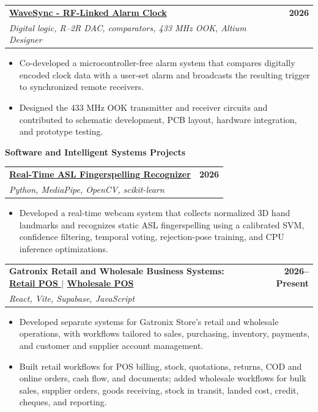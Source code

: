 \documentclass[a4paper,10pt]{article}
\makeatletter
\newcommand{\projectEntry}[3]{%
  \Needspace{9\baselineskip}%
  \begin{tabularx}{\textwidth}{@{}Xr@{}}
    \textbf{#1} & \textbf{\small #3} \\
    {\small\textit{#2}} &
  \end{tabularx}
  \vspace{0.35mm}
}
\newcommand{\projectCategory}[1]{%
  \vspace{1.0mm}
  {\normalsize\bfseries\color{accent} #1}\par
  \vspace{0.75mm}
}
\makeatother
\begin{document}
\projectEntry
  {\href{https://github.com/hakammra/wavesync-rf-alarm}  {WaveSync - RF-Linked Alarm Clock \faGithub}}
  {Digital logic, R--2R DAC, comparators, 433 MHz OOK, Altium Designer}
  {2026}
\begin{itemize}
  \item Co-developed a microcontroller-free alarm system that compares digitally encoded clock data with a user-set alarm and broadcasts the resulting trigger to synchronized remote receivers.
  \item Designed the 433 MHz OOK transmitter and receiver circuits and contributed to schematic development, PCB layout, hardware integration, and prototype testing.
\end{itemize}
\vspace{1.5mm}

\projectCategory{Software and Intelligent Systems Projects}

\projectEntry
  {\href{https://github.com/hakammra/asl-fingerspelling-webcam}{Real-Time ASL Fingerspelling Recognizer \faGithub}}
  {Python, MediaPipe, OpenCV, scikit-learn}
  {2026}
\begin{itemize}
  \item Developed a real-time webcam system that collects normalized 3D hand landmarks and recognizes static ASL fingerspelling using a calibrated SVM, confidence filtering, temporal voting, rejection-pose training, and CPU inference optimizations.
\end{itemize}
\vspace{1.35mm}

\projectEntry
  {Gatronix Retail and Wholesale Business Systems:
  \href{https://github.com/hakammra/Shop-POS}{Retail POS \faGithub}
  \enspace $\vert$ \enspace
  \href{https://github.com/hakammra/gs-wholesale}{Wholesale POS \faGithub}}
  {React, Vite, Supabase, JavaScript}
  {2026--Present}
\begin{itemize}
  \item Developed separate systems for Gatronix Store's retail and wholesale operations, with workflows tailored to sales, purchasing, inventory, payments, and customer and supplier account management.
  \item Built retail workflows for POS billing, stock, quotations, returns, COD and online orders, cash flow, and documents; added wholesale workflows for bulk sales, supplier orders, goods receiving, stock in transit, landed cost, credit, cheques, and reporting.
\end{itemize}
\vspace{1.35mm}
\end{document}
